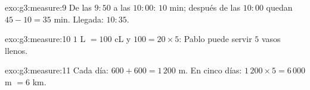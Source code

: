\begin{solution}{exo:g3:measure:9}
De las $9{:}50$ a las $10{:}00$: $10$ min; después de las $10{:}00$ quedan
$45 - 10 = 35$ min. Llegada: $10{:}35$.
\end{solution}

\begin{solution}{exo:g3:measure:10}
$1$ L $= 100$ cL y $100 = 20 \times 5$: Pablo puede servir $5$ vasos
llenos.
\end{solution}

\begin{solution}{exo:g3:measure:11}
Cada día: $600 + 600 = 1\,200$ m. En cinco días:
$1\,200 \times 5 = 6\,000$ m $= 6$ km.
\end{solution}
